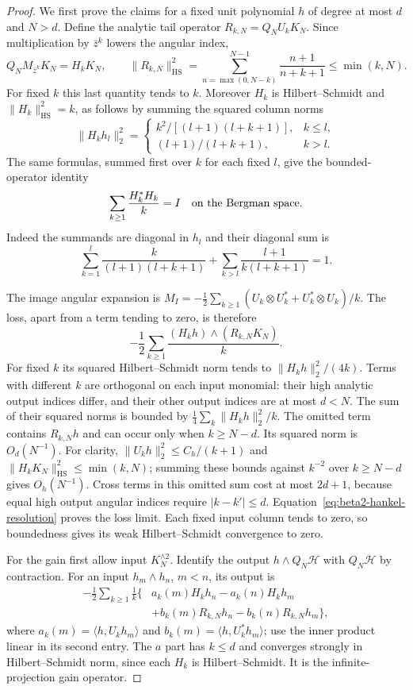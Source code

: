 \documentclass[11pt,a4paper]{article}
\numberwithin{equation}{section}
\theoremstyle{definition}
\theoremstyle{remark}
\begin{document}
\begin{proof}
We first prove the claims for a fixed unit polynomial $h$ of degree
at most $d$ and $N>d$.  Define the analytic tail operator
$R_{k,N}=Q_NU_kK_N$.  Since multiplication by $\bar z^k$ lowers
the angular index,
\[
 Q_NM_{\bar z^k}K_N=H_kK_N,\qquad
 \|R_{k,N}\|_{\mathrm{HS}}^2
 =\sum_{n=\max(0,N-k)}^{N-1}\frac{n+1}{n+k+1}
 \le\min(k,N).
\]
For fixed $k$ this last quantity tends to $k$.
Moreover $H_k$ is Hilbert--Schmidt and $\|H_k\|_{\mathrm{HS}}^2=k$,
as follows by summing the squared column norms
\[
 \|H_kh_l\|_2^2=
 \begin{cases}
 k^2/[(l+1)(l+k+1)],&k\le l,\\
 (l+1)/(l+k+1),&k>l.
 \end{cases}
\]
The same formulas, summed first over $k$ for each fixed $l$, give
the bounded-operator identity
\begin{equation}
 \sum_{k\ge1}\frac{H_k^*H_k}{k}=I
 \quad\hbox{on the Bergman space}.
 \label{eq:beta2-hankel-resolution}
\end{equation}
Indeed the summands are diagonal in $h_l$ and their diagonal sum is
\[
 \sum_{k=1}^l\frac{k}{(l+1)(l+k+1)}
       +\sum_{k>l}\frac{l+1}{k(l+k+1)}=1.
\]

The image angular expansion is
$M_I=-\tfrac12\sum_{k\ge1}(U_k\otimes U_k^*
                         +U_k^*\otimes U_k)/k$.
The loss, apart from a term tending to zero, is therefore
\[
 -\frac12\sum_{k\ge1}\frac{(H_kh)\wedge(R_{k,N}K_N)}{k}.
\]
For fixed $k$ its squared Hilbert--Schmidt norm tends to
$\|H_kh\|_2^2/(4k)$.  Terms with different $k$ are orthogonal
on each input monomial: their high analytic output indices differ,
and their other output indices are at most $d<N$.
The sum of their squared norms is bounded by
$\tfrac14\sum_k\|H_kh\|_2^2/k$.
The omitted term contains $R_{k,N}h$ and can occur only when
$k\ge N-d$.  Its squared norm is $O_d(N^{-1})$.
For clarity, $\|U_kh\|_2^2\le C_h/(k+1)$ and
$\|H_kK_N\|_{\mathrm{HS}}^2\le\min(k,N)$; summing these
bounds against $k^{-2}$ over $k\ge N-d$ gives $O_h(N^{-1})$.
Cross terms in this omitted sum cost at most $2d+1$, because equal
high output angular indices require $|k-k'|\le d$.
Equation~\eqref{eq:beta2-hankel-resolution} proves the loss limit.
Each fixed input column tends to zero, so boundedness gives its
weak Hilbert--Schmidt convergence to zero.

For the gain first allow input $K_N^{\wedge2}$.  Identify the output
$h\wedge Q_N\mathcal H$ with $Q_N\mathcal H$ by contraction.
For an input $h_m\wedge h_n$, $m<n$, its output is
\begin{align*}
 -\frac12\sum_{k\ge1}\frac1k\{&
  a_k(m)H_kh_n-a_k(n)H_kh_m\\
 &+b_k(m)R_{k,N}h_n-b_k(n)R_{k,N}h_m\},
\end{align*}
where
$a_k(m)=\langle h,U_kh_m\rangle$ and
$b_k(m)=\langle h,U_k^*h_m\rangle$; use the inner product linear
in its second entry.  The $a$ part has $k\le d$ and converges
strongly in Hilbert--Schmidt norm, since each $H_k$ is
Hilbert--Schmidt.  It is the infinite-projection gain operator.


\end{proof}
\end{document}
